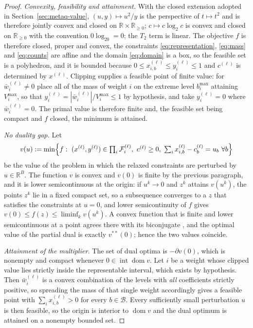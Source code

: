 \documentclass{article}
\begin{document}
\begin{proof}
\emph{Convexity, feasibility and attainment.} With the closed extension adopted in
Section~\ref{sec:metaq-value}, $(u,y)\mapsto u^2/y$ is the perspective of
$t\mapsto t^2$ and is therefore jointly convex and closed on
$\mathbb R\times\mathbb R_{\geq0}$; $c\mapsto c\log_2c$ is convex and closed on
$\mathbb R_{\geq0}$ with the convention $0\log_20=0$; the $T_2$ term is linear.
The objective $f$ is therefore closed, proper and convex, the constraints
\eqref{eq:representation}, \eqref{eq:mass} and \eqref{eq:counts} are affine and
the domain \eqref{eq:domain} is a box, so the feasible set is a polyhedron, and it
is bounded because $0\leq x_{i,b}^{(\ell)}\leq y_i^{(\ell)}\leq1$ and
$c^{(\ell)}$ is determined by $x^{(\ell)}$. Clipping supplies a feasible point of
finite value: for $\bar w_i^{(\ell)}\neq0$ place all of the mass of weight $i$ on
the extreme level $b^{\max}_i$ attaining $V_i^{\max}$, so that
$y_i^{(\ell)}=|\bar w_i^{(\ell)}|/V_i^{\max}\leq1$ by hypothesis, and take
$y_i^{(\ell)}=0$ where $\bar w_i^{(\ell)}=0$. The primal value is therefore finite
and, the feasible set being compact and $f$ closed, the minimum is attained.

\emph{No duality gap.} Let
\[
  v(u):=\min\Bigl\{f:\ (x^{(\ell)},y^{(\ell)})\in\textstyle\prod_i\mathcal F_i^{(\ell)},\
  c^{(\ell)}\geq0,\ \textstyle\sum_i x_{i,b}^{(\ell)}-c_b^{(\ell)}=u_b\ \forall b\Bigr\}
\]
be the value of the problem in which the relaxed constraints are perturbed by
$u\in\mathbb R^{B}$. The function $v$ is convex and $v(0)$ is finite by the
previous paragraph, and it is lower semicontinuous at the origin: if $u^k\to0$ and
$z^k$ attains $v(u^k)$, the points $z^k$ lie in a fixed compact set, so a
subsequence converges to a $z$ that satisfies the constraints at $u=0$, and lower
semicontinuity of $f$ gives $v(0)\leq f(z)\leq\liminf_k v(u^k)$. A convex function
that is finite and lower semicontinuous at a point agrees there with its
biconjugate \citep{rockafellar1970convex}, and the optimal value of the partial
dual is exactly $v^{**}(0)$; hence the two values coincide.

\emph{Attainment of the multiplier.} The set of dual optima is $-\partial v(0)$,
which is nonempty and compact whenever $0\in\operatorname{int}\operatorname{dom}v$.
Let $i$ be a weight whose clipped value lies strictly inside the representable
interval, which exists by hypothesis. Then $\bar w_i^{(\ell)}$ is a convex combination of the levels with
\emph{all} coefficients strictly positive, so spreading the mass of that single
weight accordingly gives a feasible point with $\sum_i x_{i,b}^{(\ell)}>0$ for
every $b\in\mathcal B$. Every sufficiently small perturbation $u$ is then feasible,
so the origin is interior to $\operatorname{dom}v$ and the dual optimum is
attained on a nonempty bounded set.
\end{proof}
\end{document}
